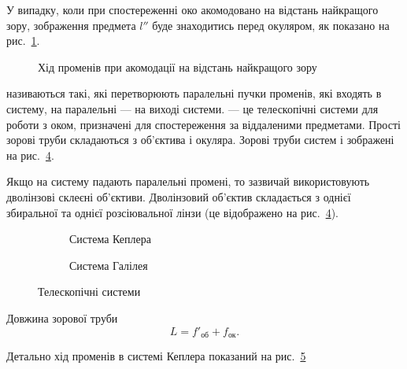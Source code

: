 У випадку, коли при спостереженні око акомодовано на відстань
найкращого зору, зображення предмета $l''$ буде знаходитись перед
окуляром, як показано на рис.~\ref{pic:microscope2}.

\begin{figure}[h!]\centering
	
	\caption{Хід променів при акомодації на відстань найкращого зору}
	\label{pic:microscope2}
\end{figure}

 називаються такі, які перетворюють
паралельні пучки променів, які входять в систему, на паралельні --- на
виході системи.  --- це телескопічні системи для роботи з оком, призначені для спостереження за віддаленими предметами.  Прості зорові труби складаються з об’єктива і окуляра. Зорові труби систем  і  зображені на рис.~\ref{pic:Telescopes}.

Якщо на систему падають паралельні промені, то зазвичай використовують дволінзові склеєні об'єктиви. Дволінзовий об'єктив складається з однієї збиральної та однієї розсіювальної лінзи (це відображено на рис.~\ref{pic:Telescopes}).

\begin{figure}[h!]\centering
	\begin{subfigure}{0.45\linewidth}\centering
		
		\caption{Система Кеплера}
		\label{pic:Kepler}
	\end{subfigure}
	\begin{subfigure}{0.45\linewidth}\centering
		
		\caption{Система Галілея}
		\label{pic:Gallileo}
	\end{subfigure}
	\caption{Телескопічні системи}
	\label{pic:Telescopes}
\end{figure}

Довжина зорової труби
\begin{equation}
	L = f'_\text{об} + f_\text{ок}.
\end{equation}

Детально хід променів в системі Кеплера показаний на рис.~\ref{pic:Kepler_rays}

\begin{figure}[h!]\centering
	
	\label{pic:Kepler_rays}
\end{figure}

